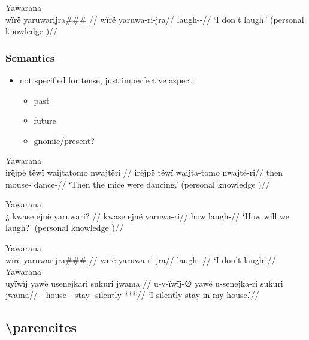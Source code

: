 \documentclass{memoir}
\begin{document}
\ex  Yawarana  \\\label{convrisamaj-4}
\begingl \glpreamble wïrë yaruwarijra### //
\gla wïrë yaruwa-ri-jra//
\glb {} laugh--//
\glft ‘I don’t laugh.’ (personal knowledge
)//
\endgl
\xe

\subsubsection{Semantics}

\begin{itemize}
\tightlist
\item
  not specified for tense, just imperfective aspect:

  \begin{itemize}
  \tightlist
  \item
    past 
  \item
    future 
  \item
    gnomic/present? 
  \end{itemize}
\end{itemize}

\ex  Yawarana  \\\label{ctorat-16}
\begingl \glpreamble irëjpë tëwï waijtatomo nwajtëri //
\gla irëjpë tëwï waijta-tomo nwajtë-ri//
\glb then  mouse- dance-//
\glft ‘Then the mice were dancing.’ (personal knowledge
)//
\endgl
\xe

\ex  Yawarana  \\\label{convrisamaj-6}
\begingl \glpreamble ¿ kwase ejnë yaruwari? //
\gla kwase ejnë yaruwa-ri//
\glb how  laugh-//
\glft ‘How will we laugh?’ (personal knowledge
)//
\endgl
\xe

\pex\label{gnomicri}    \a Yawarana\\
    \label{convrisamaj-4}        \begingl
        \glpreamble wïrë yaruwarijra\#\#\# //
        \gla wïrë yaruwa-ri-jra//
        \glb {} laugh--//
            \glft ‘I don’t laugh.’//  
        \endgl 
    \a Yawarana\\
    \label{convrisamaj-28}        \begingl
        \glpreamble uyïwïj yawë usenejkari sukuri jwama //
        \gla u-y-ïwïj-∅ yawë u-senejka-ri sukuri jwama//
        \glb {}--house-  -stay- silently ***//
            \glft ‘I silently stay in my house.’//  
        \endgl 
\xe

\subsection{\texorpdfstring{
\textbackslash parencites}{ \textbackslash parencites}}
\end{document}
